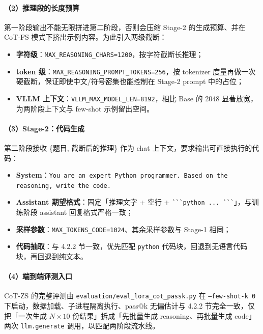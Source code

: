 \paragraph{（2）推理段的长度预算}
第一阶段输出不能无限拼进第二阶段，否则会压缩 Stage-2 的生成预算、并在 CoT-FS 模式下挤出示例内容。为此引入两级截断：
\begin{itemize}
    \item \textbf{字符级}：\texttt{MAX\_REASONING\_CHARS=1200}，按字符截断长推理；
    \item \textbf{token 级}：\texttt{MAX\_REASONING\_PROMPT\_TOKENS=256}，按 tokenizer 度量再做一次硬截断，保证即使中文/符号密集也能控制在 Stage-2 prompt 中的占位；
    \item \textbf{VLLM 上下文}：\texttt{VLLM\_MAX\_MODEL\_LEN=8192}，相比 Base 的 2048 显著放宽，为两阶段上下文与 few-shot 示例留出空间。
\end{itemize}

\paragraph{（3）Stage-2：代码生成}
第二阶段接收 \{题目, 截断后的推理\} 作为 chat 上下文，要求输出可直接执行的代码：
\begin{itemize}
    \item \textbf{System}：\texttt{You are an expert Python programmer. Based on the reasoning, write the code.}
    \item \textbf{Assistant 期望格式}：固定「推理文字 + 空行 + \verb|```python ... ```|」，与训练阶段 assistant 回复格式严格一致；
    \item \textbf{采样参数}：\texttt{MAX\_TOKENS\_CODE=1024}、其余采样参数与 Stage-1 相同；
    \item \textbf{代码抽取}：与 4.2.2 节一致，优先匹配 \texttt{python} 代码块，回退到无语言代码块，再回退到纯文本。
\end{itemize}

\paragraph{（4）端到端评测入口}
CoT-ZS 的完整评测由 \texttt{evaluation/eval\_lora\_cot\_passk.py} 在 \texttt{--few-shot-k 0} 下启动，数据加载、子进程隔离执行、pass@k 无偏估计与 4.2.2 节完全一致，仅把「一次生成 $N{\times}10$ 份结果」拆成「先批量生成 reasoning、再批量生成 code」两次 \texttt{llm.generate} 调用，以匹配两阶段流水线。
